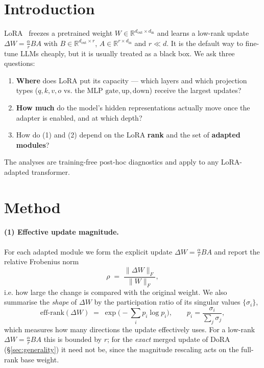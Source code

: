 \documentclass[11pt,a4paper]{article}
\begin{document}
\section{Introduction}
LoRA~\cite{hu2021lora} freezes a pretrained weight $W\in\mathbb{R}^{d_\text{out}\times d_\text{in}}$
and learns a low-rank update $\Delta W=\tfrac{\alpha}{r}BA$ with
$B\in\mathbb{R}^{d_\text{out}\times r}$, $A\in\mathbb{R}^{r\times d_\text{in}}$ and
$r\ll d$. It is the default way to fine-tune LLMs cheaply, but it is usually
treated as a black box. We ask three questions:
\begin{enumerate}
  \item \textbf{Where} does LoRA put its capacity --- which layers and which
        projection types ($q,k,v,o$ vs. the MLP $\text{gate},\text{up},\text{down}$)
        receive the largest updates?
  \item \textbf{How much} do the model's hidden representations actually move
        once the adapter is enabled, and at which depth?
  \item How do (1) and (2) depend on the LoRA \textbf{rank} and the set of
        \textbf{adapted modules}?
\end{enumerate}
The analyses are training-free post-hoc diagnostics and apply to any
LoRA-adapted transformer.

\section{Method}
\paragraph{(1) Effective update magnitude.} For each adapted module we form the
explicit update $\Delta W=\tfrac{\alpha}{r}BA$ and report the relative Frobenius
norm
\[
  \rho \;=\; \frac{\lVert \Delta W\rVert_F}{\lVert W\rVert_F},
\]
i.e. how large the change is compared with the original weight. We also summarise
the \emph{shape} of $\Delta W$ by the participation ratio of its singular values
$\{\sigma_i\}$,
\[
  \text{eff-rank}(\Delta W) \;=\; \exp\!\Big(-\sum_i p_i\log p_i\Big),\qquad
  p_i=\frac{\sigma_i}{\sum_j\sigma_j},
\]
which measures how many directions the update effectively uses. For a low-rank
$\Delta W=\tfrac{\alpha}{r}BA$ this is bounded by $r$; for the \emph{exact} merged
update of DoRA (\S\ref{sec:generality}) it need not be, since the magnitude
rescaling acts on the full-rank base weight.
\end{document}
